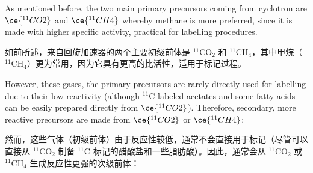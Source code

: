 \documentclass[dvipsnames, svgnames,a4paper,11pt]{article}
\begin{document}
As mentioned before, the two main primary precursors coming from cyclotron are
\(\ce{^{11}CO2}\) and \(\ce{^{11}CH4}\) whereby methane is more preferred, since it is made with higher
specific activity, practical for labelling procedures.

如前所述，来自回旋加速器的两个主要初级前体是 $\mathrm{^{11}CO_2}$ 和 $\mathrm{^{11}CH_4}$，其中甲烷（$\mathrm{^{11}CH_4}$）更为常用，因为它具有更高的比活性，适用于标记过程。

However, these gases, the primary precursors are rarely directly used for labelling
due to their low reactivity (although ${}^\mathrm{11}\mathrm{C}$-labeled acetates and some fatty acids can be
easily prepared directly from \(\ce{^{11}CO2}\)). Therefore, secondary, more reactive precursors
are made from \(\ce{^{11}CO2}\) or \(\ce{^{11}CH4}\):

然而，这些气体（初级前体）由于反应性较低，通常不会直接用于标记（尽管可以直接从 $\mathrm{^{11}CO_2}$ 制备 $\mathrm{^{11}C}$ 标记的醋酸盐和一些脂肪酸）。因此，通常会从 $\mathrm{^{11}CO_2}$ 或 $\mathrm{^{11}CH_4}$ 生成反应性更强的次级前体：
\end{document}
